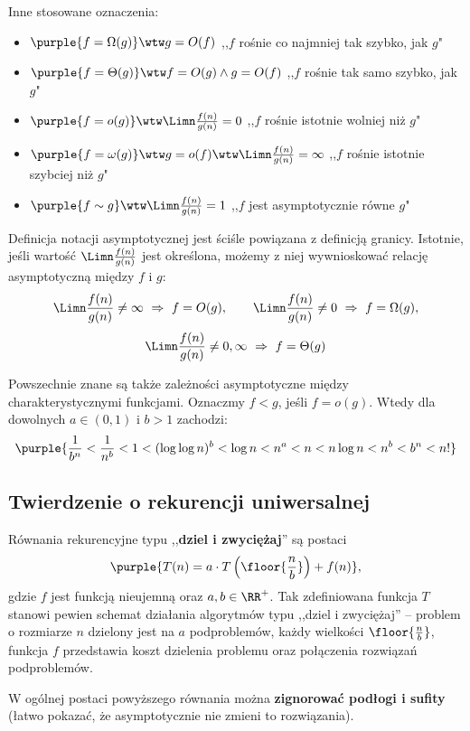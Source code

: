 Inne stosowane oznaczenia:
\begin{itemize}
    \item $\purple{f = \Omega(g)} \wtw g = O(f)$ \hfill ,,$f$ rośnie co najmniej tak szybko, jak $g$"
    \item $\purple{f = \Theta(g)} \wtw f = O(g) \land g = O(f)$ \hfill ,,$f$ rośnie tak samo szybko, jak $g$"
    \item $\purple{f = o(g)} \wtw \Limn \frac{f(n)}{g(n)} = 0$ \hfill ,,$f$ rośnie istotnie wolniej niż $g$"
    \item $\purple{f = \omega(g)} \wtw g = o(f) \wtw \Limn \frac{f(n)}{g(n)} = \infty$ \hfill ,,$f$ rośnie istotnie szybciej niż $g$"
    \item $\purple{f \sim g} \wtw \Limn \frac{f(n)}{g(n)} = 1$ \hfill ,,$f$ jest asymptotycznie równe $g$"
\end{itemize}

Definicja notacji asymptotycznej jest ściśle powiązana z definicją granicy. Istotnie, jeśli wartość $\Limn \frac{f(n)}{g(n)}$ jest określona, możemy z niej wywnioskować relację asymptotyczną między $f$ i $g$:
$$\Limn \frac{f(n)}{g(n)} \neq \infty \ \Rightarrow \ f = O(g), \qquad \Limn \frac{f(n)}{g(n)} \neq 0 \ \Rightarrow \ f = \Omega(g),$$
$$\Limn \frac{f(n)}{g(n)} \neq 0, \infty \ \Rightarrow \ f = \Theta(g)$$

Powszechnie znane są także zależności asymptotyczne między charakterystycznymi funkcjami. Oznaczmy $f < g$, jeśli $f = o(g)$. Wtedy dla dowolnych $a \in (0, 1)$ i $b > 1$ zachodzi:
$$\purple{\frac{1}{b^n} < \frac{1}{n^b} < 1 < (\log \log n)^b < \log n < n^a < n < n \log n < n^b < b^n < n!}$$

\subsection{Twierdzenie o rekurencji uniwersalnej}

Równania rekurencyjne typu ,,\textbf{dziel i zwyciężaj}'' są postaci
$$\purple{T(n) = a \cdot T\left(\floor{\frac{n}{b}}\right) + f(n)},$$
gdzie $f$ jest funkcją nieujemną oraz $a, b \in \RR^+$. Tak zdefiniowana funkcja $T$ stanowi pewien schemat działania algorytmów typu ,,dziel i zwyciężaj'' -- problem o rozmiarze $n$ dzielony jest na $a$ podproblemów, każdy wielkości $\floor{\frac{n}{b}}$, funkcja $f$ przedstawia koszt dzielenia problemu oraz połączenia rozwiązań podproblemów.

W ogólnej postaci powyższego równania można \textbf{zignorować podłogi i sufity} (łatwo pokazać, że asymptotycznie nie zmieni to rozwiązania).

